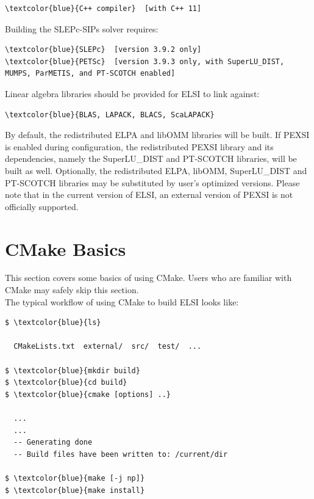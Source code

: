 \documentclass{report}
\begin{document}
\begin{Verbatim}[commandchars=\\\{\}]
\textcolor{blue}{C++ compiler}  [with C++ 11]
\end{Verbatim}

Building the SLEPc-SIPs solver requires:\\

\begin{Verbatim}[commandchars=\\\{\}]
\textcolor{blue}{SLEPc}  [version 3.9.2 only]
\textcolor{blue}{PETSc}  [version 3.9.3 only, with SuperLU_DIST, MUMPS, ParMETIS, and PT-SCOTCH enabled]
\end{Verbatim}

Linear algebra libraries should be provided for ELSI to link against:\\

\begin{Verbatim}[commandchars=\\\{\}]
\textcolor{blue}{BLAS, LAPACK, BLACS, ScaLAPACK}
\end{Verbatim}

By default, the redistributed ELPA and libOMM libraries will be built.  If PEXSI is enabled during configuration, the redistributed PEXSI library and its dependencies, namely the SuperLU\_DIST and PT-SCOTCH libraries, will be built as well.  Optionally, the redistributed ELPA, libOMM, SuperLU\_DIST and PT-SCOTCH libraries may be substituted by user's optimized versions.  Please note that in the current version of ELSI, an external version of PEXSI is not officially supported.\\

\section{CMake Basics}
\label{sec:cmake}
This section covers some basics of using CMake.  Users who are familiar with CMake may safely skip this section.\\

The typical workflow of using CMake to build ELSI looks like:\\

\begin{Verbatim}[commandchars=\\\{\}]
$ \textcolor{blue}{ls}

  CMakeLists.txt  external/  src/  test/  ...

$ \textcolor{blue}{mkdir build}
$ \textcolor{blue}{cd build}
$ \textcolor{blue}{cmake [options] ..}

  ...
  ...
  -- Generating done
  -- Build files have been written to: /current/dir

$ \textcolor{blue}{make [-j np]}
$ \textcolor{blue}{make install}
\end{Verbatim}
\end{document}
